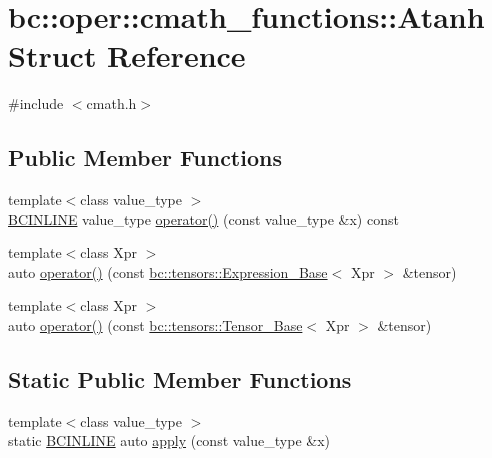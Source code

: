 \hypertarget{structbc_1_1oper_1_1cmath__functions_1_1Atanh}{}\section{bc\+:\+:oper\+:\+:cmath\+\_\+functions\+:\+:Atanh Struct Reference}
\label{structbc_1_1oper_1_1cmath__functions_1_1Atanh}


{\ttfamily \#include $<$cmath.\+h$>$}

\subsection*{Public Member Functions}
\begin{DoxyCompactItemize}
\item 
{\footnotesize template$<$class value\+\_\+type $>$ }\\\hyperlink{common_8h_a6699e8b0449da5c0fafb878e59c1d4b1}{B\+C\+I\+N\+L\+I\+NE} value\+\_\+type \hyperlink{structbc_1_1oper_1_1cmath__functions_1_1Atanh_a945737670a9851de8649a39f545c9a3d}{operator()} (const value\+\_\+type \&x) const
\item 
{\footnotesize template$<$class Xpr $>$ }\\auto \hyperlink{structbc_1_1oper_1_1cmath__functions_1_1Atanh_af695ef95e7047389ff28c7685bee22d2}{operator()} (const \hyperlink{classbc_1_1tensors_1_1Expression__Base}{bc\+::tensors\+::\+Expression\+\_\+\+Base}$<$ Xpr $>$ \&tensor)
\item 
{\footnotesize template$<$class Xpr $>$ }\\auto \hyperlink{structbc_1_1oper_1_1cmath__functions_1_1Atanh_a54634c8570f9e603628ad005899d6391}{operator()} (const \hyperlink{classbc_1_1tensors_1_1Tensor__Base}{bc\+::tensors\+::\+Tensor\+\_\+\+Base}$<$ Xpr $>$ \&tensor)
\end{DoxyCompactItemize}
\subsection*{Static Public Member Functions}
\begin{DoxyCompactItemize}
\item 
{\footnotesize template$<$class value\+\_\+type $>$ }\\static \hyperlink{common_8h_a6699e8b0449da5c0fafb878e59c1d4b1}{B\+C\+I\+N\+L\+I\+NE} auto \hyperlink{structbc_1_1oper_1_1cmath__functions_1_1Atanh_a863d6d8418c2073776d4c85e5516ede4}{apply} (const value\+\_\+type \&x)
\end{DoxyCompactItemize}


